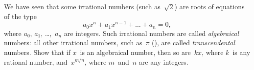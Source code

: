 We have seen that some irrational numbers
(such as~$\sqrt{2}$) are roots of equations of the type
\[
a_{0}x^{n} + a_{1}x^{n-1} + \dots + a_{n} = 0,
\]
where $a_{0}$, $a_{1}$, \dots,~$a_{n}$ are integers. Such irrational numbers are called \emph{algebraical}
numbers: all other irrational numbers, such as~$\pi$ (), are called
\emph{transcendental} numbers. Show that if $x$~is an algebraical number, then so are~$kx$,
where $k$~is any rational number, and~$x^{m/n}$, where $m$~and~$n$ are any integers.

